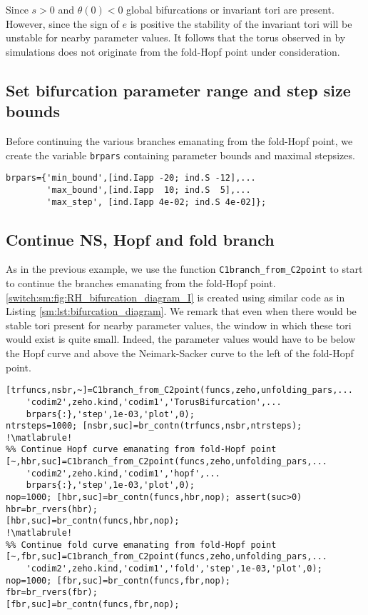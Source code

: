 Since $s > 0$ and $\theta(0) < 0$ global bifurcations or invariant tori are present. However, since the sign of $e$ is 
positive the stability of the invariant tori will be unstable for nearby parameter values. It follows that the torus observed in \cite{Ma2011} by simulations does not originate from the fold-Hopf point under consideration.

\subsection{Set bifurcation parameter range and step size bounds}
Before continuing the various branches emanating from the fold-Hopf point, we create the variable \lstinline|brpars| containing parameter bounds and maximal stepsizes.
\begin{lstlisting}[style=customMatlab]
%% Set bifurcation parameter range and step size bounds
brpars={'min_bound',[ind.Iapp -20; ind.S -12],...
        'max_bound',[ind.Iapp  10; ind.S  5],...
        'max_step', [ind.Iapp 4e-02; ind.S 4e-02]};
\end{lstlisting}
\subsection{Continue NS, Hopf and fold branch} \label{switch:sm:sec:RH:continuation}
As in the previous example, we use the function \lstinline|C1branch_from_C2point| to start to continue the branches emanating from the fold-Hopf point. \cref{switch:sm:fig:RH_bifurcation_diagram_I} is created using similar code as in Listing \ref{sm:lst:bifurcation_diagram}. We remark that even when there would be stable tori present for nearby parameter values, the window in which these tori would exist is quite small. Indeed, the parameter values would have to be below the Hopf curve and above the Neimark-Sacker curve to the left of the fold-Hopf point.
\begin{lstlisting}[style=customMatlab,escapechar=!]
%% Continue Neimark-Sacker curve emanating from fold-Hopf point
[trfuncs,nsbr,~]=C1branch_from_C2point(funcs,zeho,unfolding_pars,...
    'codim2',zeho.kind,'codim1','TorusBifurcation',...
    brpars{:},'step',1e-03,'plot',0);
ntrsteps=1000; [nsbr,suc]=br_contn(trfuncs,nsbr,ntrsteps);
!\matlabrule!
%% Continue Hopf curve emanating from fold-Hopf point
[~,hbr,suc]=C1branch_from_C2point(funcs,zeho,unfolding_pars,...
    'codim2',zeho.kind,'codim1','hopf',...
    brpars{:},'step',1e-03,'plot',0);
nop=1000; [hbr,suc]=br_contn(funcs,hbr,nop); assert(suc>0)
hbr=br_rvers(hbr);
[hbr,suc]=br_contn(funcs,hbr,nop);
!\matlabrule!
%% Continue fold curve emanating from fold-Hopf point
[~,fbr,suc]=C1branch_from_C2point(funcs,zeho,unfolding_pars,...
    'codim2',zeho.kind,'codim1','fold','step',1e-03,'plot',0);
nop=1000; [fbr,suc]=br_contn(funcs,fbr,nop);
fbr=br_rvers(fbr);
[fbr,suc]=br_contn(funcs,fbr,nop);
\end{lstlisting}

